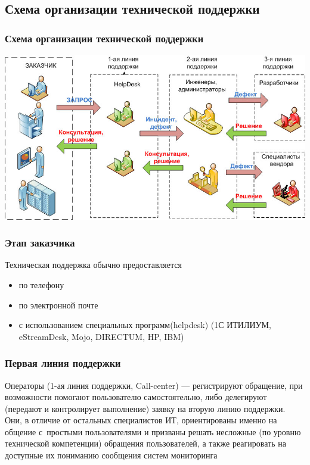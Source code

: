 \documentclass{../industrial-development}
\begin{document}
\subsection{Схема организации технической поддержки}
\begin{frame} \frametitle{Схема организации технической поддержки}
    \centerline{\includegraphics[width=\textwidth]{structure.jpg}}
\end{frame}

\lecturenotes

\begin{frame} \frametitle{Этап заказчика}

Техническая поддержка обычно предоставляется 
	\begin{itemize}
        \item по телефону
        \item по электронной почте
        \item с использованием специальных программ(helpdesk) (1С ИТИЛИУМ, eStreamDesk, Mojo, DIRECTUM, HP, IBM)
	\end{itemize}
\end{frame}

\lecturenotes

\begin{frame} \frametitle{Первая линия поддержки}

    Операторы (1-ая линия поддержки, Call-center) — регистрируют обращение, при возможности помогают пользователю самостоятельно, либо делегируют (передают и контролирует выполнение) заявку на вторую линию поддержки.
    \newline
    \newline
    Они, в отличие от остальных специалистов ИТ, ориентированы именно на общение с~простыми пользователями и призваны решать несложные (по уровню технической компетенции) обращения пользователей, а также реагировать на доступные их пониманию сообщения систем мониторинга

\end{frame}
\lecturenotes
\end{document}
